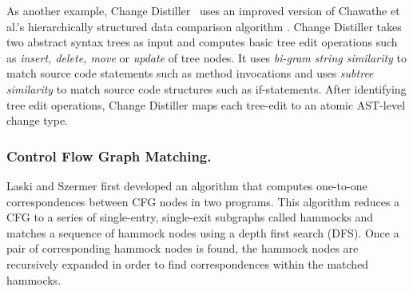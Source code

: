 
As another example, Change Distiller~\cite{FWP2007} uses an improved version of Chawathe et al.'s hierarchically structured data comparison algorithm \cite{Chawathe1996}. Change Distiller takes two abstract syntax trees as input and computes basic tree edit operations such as {\it insert, delete, move} or {\it update} of tree nodes. It uses {\it bi-gram string similarity} to match source code statements such as method invocations and uses {\it subtree similarity} to match source code structures such as if-statements. After identifying tree edit operations, Change Distiller maps each tree-edit to an atomic AST-level change type. 



\subsubsection{Control Flow Graph Matching.}
Laski and Szermer \cite{Laski1992} first developed an algorithm that computes one-to-one correspondences between CFG nodes in two programs. This algorithm reduces a CFG to a series of single-entry, single-exit subgraphs called hammocks and matches a sequence of hammock nodes using a depth first search (DFS). Once a pair of corresponding hammock nodes is found, the hammock nodes are recursively expanded in order to find correspondences within the matched hammocks. 
 
